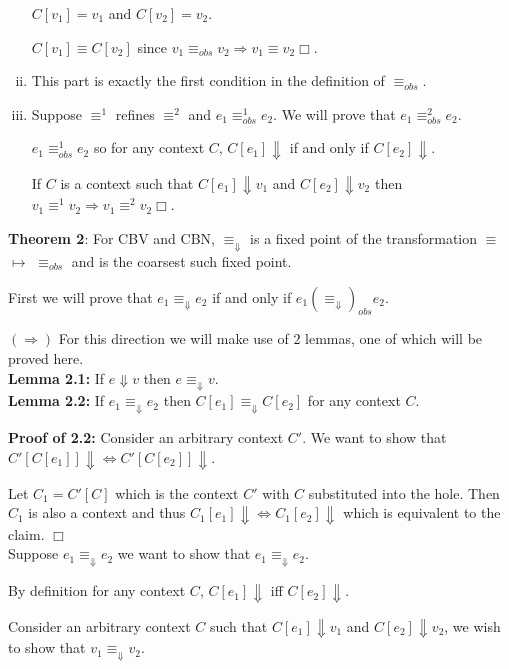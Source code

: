 \documentclass[10pt]{article}
\begin{document}
\begin{enumerate}[(i)]
$C[v_1] = v_1$ and $C[v_2] = v_2$.

$C[v_1] \equiv C[v_2]$ since   $v_1 \equiv_{obs} v_2 \Rightarrow v_1 \equiv v_2 \Box$.
\item This part is exactly the first condition in the definition of $\equiv_{obs}$.
\item Suppose $\equiv^1$ refines $\equiv^2$ and $e_1 \equiv^1_{obs} e_2$. We will prove that $e_1 \equiv^2_{obs} e_2$.

$e_1 \equiv^1_{obs} e_2$ so for any context $C$, $C[e_1] \Downarrow$ if and only if $C[e_2] \Downarrow$.

If $C$ is a context such that $C[e_1] \Downarrow v_1$ and $C[e_2] \Downarrow v_2$ then $v_1 \equiv^1 v_2 \Rightarrow v_1 \equiv^2 v_2 \Box$.
\end{enumerate}

\textbf{Theorem 2}: For CBV and CBN, $\equiv_{\Downarrow}$ is a fixed point of the transformation $\equiv$  $\mapsto$  $\equiv_{obs}$  and is the coarsest such fixed point.

First we will prove that $e_1 \equiv_{\Downarrow} e_2$ if and only if $e_1  (\equiv_{\Downarrow})_{obs} e_2$.

$(\Rightarrow)$ For this direction we will make use of 2 lemmas, one of which will be proved here.\\

\textbf{Lemma 2.1:} If $e \Downarrow v$ then $e \equiv_{\Downarrow} v$.\\

\textbf{Lemma 2.2:} If $e_1 \equiv_{\Downarrow} e_2$ then $C[e_1] \equiv_{\Downarrow} C[e_2]$ for any context $C$.

\textbf{Proof of 2.2:} Consider an arbitrary context $C'$. We want to show that $C'[C[e_1]] \Downarrow \Leftrightarrow C'[C[e_2]] \Downarrow$.

Let $C_1 = C'[C]$ which is the context $C'$ with $C$ substituted into the hole. Then $C_1$ is also a context and thus $C_1[e_1] \Downarrow \Leftrightarrow C_1[e_2] \Downarrow$ which is equivalent to the claim. $\Box$\\

Suppose  $e_1 \equiv_{\Downarrow} e_2$ we want to show that $e_1 \equiv_{\Downarrow} e_2.$

By definition for any context $C$, $C[e_1] \Downarrow$ iff $C[e_2] \Downarrow$.

Consider an arbitrary context $C$ such that $C[e_1] \Downarrow v_1$ and $C[e_2] \Downarrow v_2$, we wish to show that $v_1 \equiv_{\Downarrow} v_2$.
\end{document}
